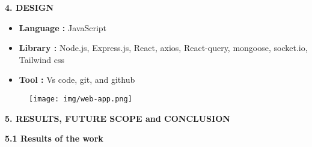 \documentclass{article}
\begin{document}
\vspace{25pt}




\newpage

\begin{center}
\LARGE\bfseries 4. DESIGN \\
\end{center}



\begin{itemize}
    \item {\bfseries Language :} JavaScript
    \item  {\bfseries Library :} Node.js, Express.js, React,  axios, React-query, mongoose, socket.io, Tailwind css
    \item {\bfseries Tool :} Vs code, git, and github
\end{itemize}

\begin{figure}[h]
    \centering
    \texttt{[image: img/web-app.png]}
\end{figure}

\vspace{25pt}




\newpage

\begin{center}
    \LARGE\bfseries 5. RESULTS, FUTURE SCOPE and CONCLUSION\\
\end{center}

{\Large\bfseries 5.1 Results of the work \\}
\end{document}
